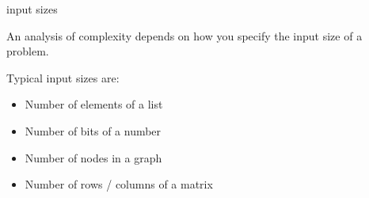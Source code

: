 \begin{vbframe}{input sizes}

An analysis of complexity depends on how you specify the input size of a problem.

\lz

Typical input sizes are:

\begin{itemize}
\item Number of elements of a list
\item Number of bits of a number
\item Number of nodes in a graph
\item Number of rows / columns of a matrix
\end{itemize}

\end{vbframe}


